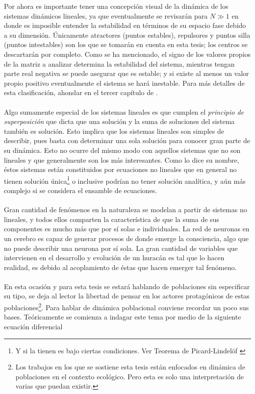 Por ahora es importante tener una concepción visual de la dinámica de los sistemas dinámicos lineales, ya que eventualmente se revisarán para $N\gg 1$ en donde es imposible entender la estabilidad en términos de su espacio fase debido a su dimensión. Únicamente atractores (puntos estables), repulsores y puntos silla (puntos intestables) son los que se tomarán en cuenta en esta tesis; los centros se descartarán por completo. Como se ha mencionado, el signo de los valores propios de la matriz a analizar determina la estabilidad del sistema, mientras tengan parte real negativa se puede asegurar que es estable; y si existe al menos un valor propio positivo eventualmente el sistema se hará inestable. Para más detalles de esta clasificación, ahondar en el tercer capítulo de  \cite{hirsch2013differential}.\\
\\
Algo sumamente especial de los sistemas lineales es que cumplen el \textit{principio de superposición} que dicta que una solución y la suma de soluciones del sistema también es solución. Esto implica que los sistemas lineales son simples de describir, pues basta con determinar una sola solución para conocer gran parte de su dinámica. Esto no ocurre del mismo modo con aquellos sistemas que no son lineales y que generalmente son los más interesantes. Como lo dice su nombre, éstos sistemas están constituidos por ecuaciones no lineales que en general no tienen solución única\footnote{Y si la tienen es bajo ciertas condiciones. Ver Teorema de Picard-Lindelöf \cite{CauchyLipschitzTheorem}} o inclusive podrían no tener solución analítica, y aún más complejo si se considera el ensamble de ecuaciones.\\
\\
Gran cantidad de fenómenos en la naturaleza se modelan a partir de sistemas no lineales, y todos ellos comparten la característica de que la suma de sus componentes es mucho más que por sí solas e individuales. La red de neuronas en un cerebro es capaz de generar procesos de donde emerge la consciencia, algo que no puede describir una neurona por sí sola. La gran cantidad de variables que intervienen en el desarrollo y evolución de un huracán es tal que lo hacen realidad, es debido al acoplamiento de éstas que hacen emerger tal fenómeno.\\
\\
En esta ocasión y para esta tesis se estará hablando de poblaciones sin especificar su tipo, se deja al lector la libertad de pensar en los actores protagónicos de estas poblaciones\footnote{Los trabajos en los que se sostiene esta tesis están enfocados en dinámica de poblaciones en el contexto ecológico. Pero esta es solo una interpretación de varias que puedan existir.}. Para hablar de dinámica poblacional conviene recordar un poco sus bases. Teóricamente se comienza a indagar este tema por medio de la siguiente ecuación diferencial

